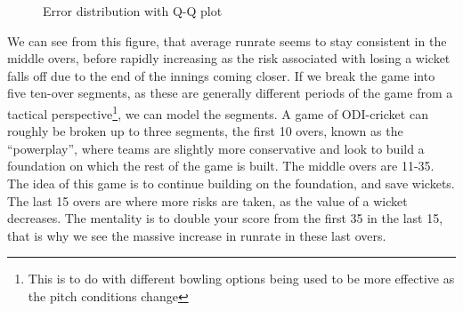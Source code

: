 \begin{figure}[h]
    \centering
    \qquad
    \caption{Error distribution with Q-Q plot}
    \label{errdistqq3}
\end{figure}

We can see from this figure, that average runrate seems to stay consistent in the middle overs, before rapidly increasing as the risk associated with losing 
a wicket falls off due to the end of the innings coming closer. If we break the game into five ten-over segments, as these are generally different periods of the game
from a tactical perspective\footnote{This is to do with different bowling options being used to be more effective as the pitch conditions change}, we can model the segments.
A game of ODI-cricket can roughly be broken up to three segments, the first 10 overs, known as the ``powerplay'', where teams are slightly more conservative and look to build a 
foundation on which the rest of the game is built. The middle overs are 11-35. The idea of this game is to continue building on the foundation, and save wickets. The last 
15 overs are where more risks are taken, as the value of a wicket decreases. The mentality is to double your score from the first 35 in the last 15, that is why we see the massive 
increase in runrate in these last overs. \\

